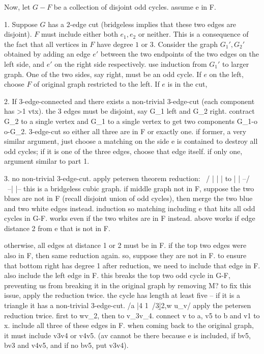 Now, let $G-F$ be a collection of disjoint odd cycles. assume e in F.

1. Suppose $G$ has a $2$-edge cut (bridgeless implies that these two edges are disjoint). $F$ must include either both $e_1,e_2$ or neither. This is a consequence of the fact that all vertices in $F$ have degree $1$ or $3$. Consider the graph $G_1',G_2'$ obtained by adding an edge $e'$ between the two endpoints of the two edges on the left side, and $e'$ on the right side respectively.
use induction from $G_1'$ to larger graph. One of the two sides, say right, must be an odd cycle. If $e$ on the left, choose $F$ of original graph restricted to the left.
If $e$ is in the cut, 

2. If $3$-edge-connected and there exists a non-trivial 3-edge-cut (each component has >1 vtx). the 3 edges must be disjoint, say G_1 left and G_2 right. contract G_2 to a single vertex and G_1 to a single vertex to get two components G_1-o o-G_2. 3-edge-cut so either all three are in F or exactly one. if former, a very similar argument, just choose a matching on the side e is contained to destroy all odd cycles; if it is one of the three edges, choose that edge itself. if only one, argument similar to part 1.

3. no non-trivial 3-edge-cut. apply petersen theorem reduction:
  \ /       |  |
   |   to   |  |
--/ \     --|  |--
this is a bridgeless cubic graph.
if middle graph not in F, suppose the two blues are not in F (recall disjoint union of odd cycles), then merge the two blue and two white edges instead. induction so matching including e that hits all odd cycles in G-F. works even if the two whites are in F instead.
above works if edge distance 2 from e that is not in F.

otherwise, all edges at distance 1 or 2 must be in F. if the top two edges were also in F, then same reduction again. so, suppose they are not in F. to ensure that bottom right has degree 1 after reduction, we need to include that edge in F. also include the left edge in F. this breaks the top two odd cycle in G-F, preventing us from breaking it in the original graph by removing M? to fix this issue, apply the reduction twice. the cycle has length at least five -- if it is a triangle it has a non-trivial 3-edge-cut. 
    \5/a
     |4
  1\ /3\b
    |2,w
u_v/ \x
apply the petersen reduction twice. first to wv_2, then to v_3v_4. connect v to a, v5 to b and v1 to x. include all three of these edges in F.
when coming back to the original graph, it must include v3v4 or v4v5. (av cannot be there because e is included, if bv5, bv3 and v4v5, and if no bv5, put v3v4).

